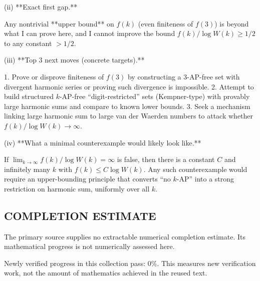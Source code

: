 (ii) **Exact first gap.**

Any nontrivial **upper bound** on $f(k)$ (even finiteness of $f(3)$) is beyond what I can prove here, and I cannot improve the bound $f(k)/\log W(k)\ge 1/2$ to any constant $>1/2$.

(iii) **Top 3 next moves (concrete targets).**

1. Prove or disprove finiteness of $f(3)$ by constructing a 3-AP-free set with divergent harmonic series or proving such divergence is impossible.
2. Attempt to build structured $k$-AP-free “digit-restricted” sets (Kempner-type) with provably large harmonic sums and compare to known lower bounds.
3. Seek a mechanism linking large harmonic sum to large van der Waerden numbers to attack whether $f(k)/\log W(k)\to\infty$.

(iv) **What a minimal counterexample would likely look like.**

If $\lim_{k\to\infty} f(k)/\log W(k)=\infty$ is false, then there is a constant $C$ and infinitely many $k$ with $f(k)\le C\log W(k)$. Any such counterexample would require an upper-bounding principle that converts “no $k$-AP” into a strong restriction on harmonic sum, uniformly over all $k$.




\subsection*{COMPLETION ESTIMATE}
The primary source supplies no extractable numerical completion estimate. Its mathematical progress is not numerically assessed here.

Newly verified progress in this collection pass: $0\%$. This measures new verification work, not the amount of mathematics achieved in the reused text.
